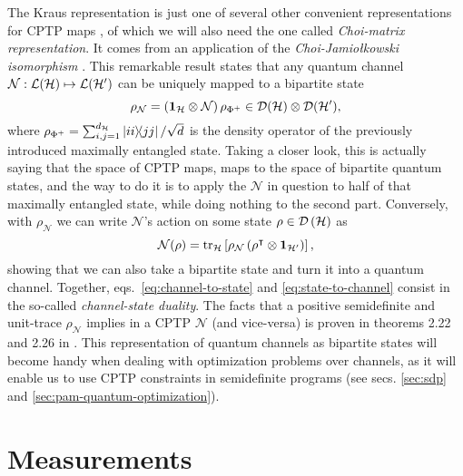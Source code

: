 		The Kraus representation is just one of several other convenient representations for CPTP maps \cite{wood_2015_tensor}, of which we will also need the one called \emph{Choi-matrix representation}. It comes from an application of the \emph{Choi-Jamiołkowski isomorphism} \cite{jamiolkowski,jiang_2013_channelstate}. This remarkable result states that any quantum channel $\mathcal{N} : \mathcal{L}(\mathcal{H}) \mapsto \mathcal{L}(\mathcal{H}^\prime)$ can be uniquely mapped to a bipartite state
		\begin{equation}
			\rho_{\mathcal{N}} = \left(\mathbf{1}_{\mathcal{H}} \otimes \mathcal{N} \right) \rho_{\Phi^+} \in \mathcal{D}(\mathcal{H}) \otimes \mathcal{D}(\mathcal{H}^\prime) ,
			\label{eq:channel-to-state}
		\end{equation}
		where $\rho_{\Phi^+} = \sum_{i,j=1}^{d_{\mathcal{H}}} \ketbra{ii}{jj} / \sqrt{d}$ is the density operator of the previously introduced maximally entangled state. Taking a closer look, this is actually saying that the space of CPTP maps, maps to the space of bipartite quantum states, and the way to do it is to apply the $\mathcal{N}$ in question to half of that maximally entangled state, while doing nothing to the second part. Conversely, with $\rho_{\mathcal{N}}$ we can write $\mathcal{N}$'s action on some state $\rho \in \mathcal{D}\left( \mathcal{H} \right)$ as
		\begin{equation}
			\mathcal{N}(\rho) = \text{tr}_{\mathcal{H}}\left[ \rho_{\mathcal{N}} \left( \rho^\intercal \otimes \mathbf{1}_{\mathcal{H}^\prime} \right) \right] ,
			\label{eq:state-to-channel}
		\end{equation}
		showing that we can also take a bipartite state and turn it into a quantum channel. Together, eqs.~\eqref{eq:channel-to-state} and \eqref{eq:state-to-channel} consist in the so-called \emph{channel-state duality}. The facts that a positive semidefinite and unit-trace $\rho_{\mathcal{N}}$ implies in a CPTP $\mathcal{N}$ (and vice-versa) is proven in theorems 2.22 and 2.26 in \cite{watrous_book_2018}. This representation of quantum channels as bipartite states will become handy when dealing with optimization problems over channels, as it will enable us to use CPTP constraints in semidefinite programs (see secs. \ref{sec:sdp} and \ref{sec:pam-quantum-optimization}).
		

	\section{Measurements}
	\label{sec:measurements}
	
